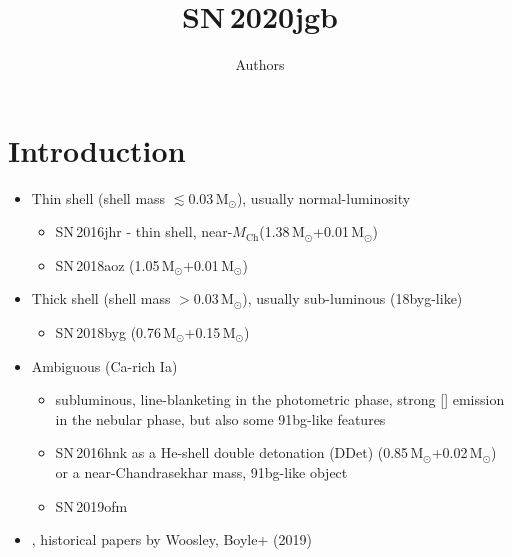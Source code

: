\documentclass[twocolumn]{aastex631}
\newcommand{\sn}{SN\,2020jgb}
\newcommand{\Mch}{$M_\mathrm{Ch}$}
\begin{document}
\title{\sn}

\author{Authors}

\begin{abstract}

\end{abstract}


\section{Introduction} \label{sec:intro}
\begin{itemize}
    \item Thin shell (shell mass $\lesssim0.03\,\mathrm{M_\odot}$), usually normal-luminosity
    \begin{itemize}
        \item SN\,2016jhr \citep{jiang_16jhr_2017} - thin shell, near-\Mch (1.38\,$\mathrm{M_\odot}$+0.01\,$\mathrm{M_\odot}$)
        \item SN\,2018aoz (1.05\,$\mathrm{M_\odot}$+0.01\,$\mathrm{M_\odot}$)\citep{Ni_2022}
    \end{itemize}
    \item Thick shell (shell mass $>0.03\,\mathrm{M_\odot}$), usually sub-luminous (18byg-like)
    \begin{itemize}
        \item SN\,2018byg (0.76\,$\mathrm{M_\odot}$+0.15\,$\mathrm{M_\odot}$) \citep{de_18byg_2019}
    \end{itemize}
    \item Ambiguous (Ca-rich Ia)
    \begin{itemize}
        \item subluminous, line-blanketing in the photometric phase, strong [] emission in the nebular phase, but also some 91bg-like features
        \item SN\,2016hnk as a He-shell double detonation (DDet) \citep{jacobson-galan_16hnk_2020} (0.85\,$\mathrm{M_\odot}$+0.02\,$\mathrm{M_\odot}$) or a near-Chandrasekhar mass, 91bg-like object \citep{galbany_16hnk_2019}
        \item SN\,2019ofm \citep{de_Ca_rich_2020}
    \end{itemize}

        
    
    \item \citep{polin_observational_2019}, historical papers by Woosley, Boyle+ (2019)
\end{itemize}
\end{document}
